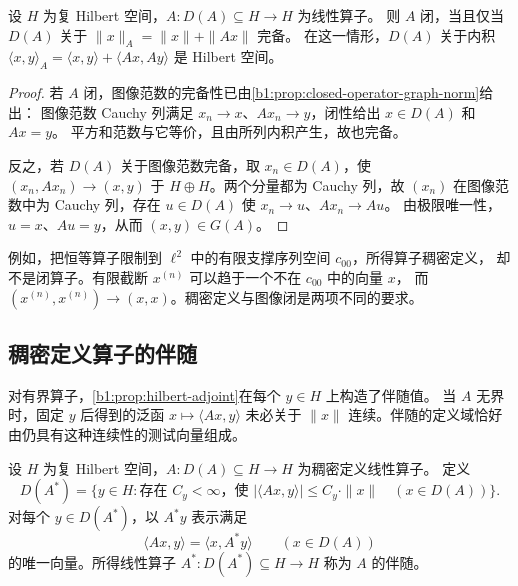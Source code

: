 \begin{proposition}[图像范数与闭性]
\label{b1:prop:29-graph-complete}
设 \(H\) 为复 Hilbert 空间，\(A:D(A)\subseteq H\to H\) 为线性算子。
则 \(A\) 闭，当且仅当 \(D(A)\) 关于 \(\|x\|_A=\|x\|+\|Ax\|\) 完备。
在这一情形，\(D(A)\) 关于内积
\(\langle x,y\rangle_A=\langle x,y\rangle+\langle Ax,Ay\rangle\) 是 Hilbert 空间。
\end{proposition}
\begin{proof}
若 \(A\) 闭，图像范数的完备性已由\cref{b1:prop:closed-operator-graph-norm}给出：
图像范数 Cauchy 列满足 \(x_n\to x\)、\(Ax_n\to y\)，闭性给出 \(x\in D(A)\) 和 \(Ax=y\)。
平方和范数与它等价，且由所列内积产生，故也完备。

反之，若 \(D(A)\) 关于图像范数完备，取 \(x_n\in D(A)\)，使
\((x_n,Ax_n)\to(x,y)\) 于 \(H\oplus H\)。两个分量都为 Cauchy 列，故 \((x_n)\)
在图像范数中为 Cauchy 列，存在 \(u\in D(A)\) 使 \(x_n\to u\)、\(Ax_n\to Au\)。
由极限唯一性，\(u=x\)、\(Au=y\)，从而 \((x,y)\in G(A)\)。
\end{proof}

例如，把恒等算子限制到 \(\ell^2\) 中的有限支撑序列空间 \(c_{00}\)，所得算子稠密定义，
却不是闭算子。有限截断 \(x^{(n)}\) 可以趋于一个不在 \(c_{00}\) 中的向量 \(x\)，
而 \((x^{(n)},x^{(n)})\to(x,x)\)。稠密定义与图像闭是两项不同的要求。

\subsection{稠密定义算子的伴随}
\label{b1:subsec:290502}

对有界算子，\cref{b1:prop:hilbert-adjoint}在每个 \(y\in H\) 上构造了伴随值。
当 \(A\) 无界时，固定 \(y\) 后得到的泛函 \(x\mapsto\langle Ax,y\rangle\)
未必关于 \(\|x\|\) 连续。伴随的定义域恰好由仍具有这种连续性的测试向量组成。

\begin{definition}[稠密定义算子的伴随]
\label{b1:def:29-unbounded-adjoint}
设 \(H\) 为复 Hilbert 空间，\(A:D(A)\subseteq H\to H\) 为稠密定义线性算子。
定义
\[
 D(A^*)=\{y\in H:\text{存在 }C_y<\infty\text{，使 }
 |\langle Ax,y\rangle|\leq C_y\cdot\|x\|\quad(x\in D(A))\}.
\]
对每个 \(y\in D(A^*)\)，以 \(A^*y\) 表示满足
\begin{equation}\label{b1:eq:29-adjoint-pairing}
 \langle Ax,y\rangle=\langle x,A^*y\rangle\qquad(x\in D(A))
\end{equation}
的唯一向量。所得线性算子 \(A^*:D(A^*)\subseteq H\to H\) 称为 \(A\) 的伴随。
\end{definition}

